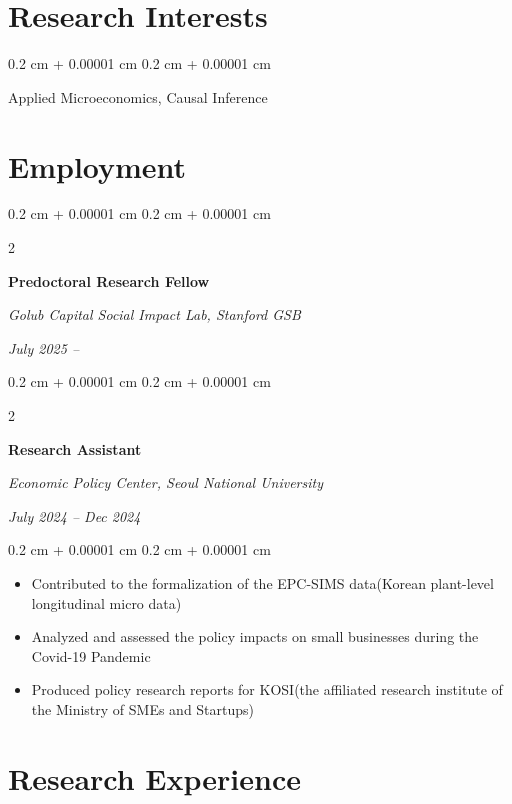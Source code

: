 \documentclass[10pt, letterpaper]{article}
\newenvironment{highlights}{
	\begin{itemize}[
		topsep=0.10 cm,
		parsep=0.10 cm,
		partopsep=0pt,
		itemsep=0pt,
		leftmargin=0.4 cm + 10pt
		]
	}{
	\end{itemize}
} %
\newenvironment{onecolentry}{
	\begin{adjustwidth}{
			0.2 cm + 0.00001 cm
		}{
			0.2 cm + 0.00001 cm
		}
	}{
	\end{adjustwidth}
} %
\newenvironment{twocolentry}[2][]{
	\onecolentry
	\def\secondColumn{#2}
	\setcolumnwidth{\fill, 4.5 cm}
	\begin{paracol}{2}
	}{
		\switchcolumn \raggedleft \secondColumn
	\end{paracol}
	\endonecolentry
} %
\begin{document}
	
	
	
		\section{Research Interests}
	
	\begin{onecolentry}
Applied Microeconomics, Causal Inference
	\end{onecolentry}
	
	\vspace{0.2 cm}
	
	
	\section{Employment}
	
			\begin{twocolentry}{
			\textit{July 2025 –}    
			
			\textit{}}
		\textbf{Predoctoral Research Fellow}
		
		\textit{Golub Capital Social Impact Lab, Stanford GSB}
	\end{twocolentry}
	
	\vspace{0.20cm}
		\begin{twocolentry}{
			\textit{July 2024 – Dec 2024}    
			
			\textit{}}
		\textbf{Research Assistant}
		
		\textit{Economic Policy Center, Seoul National University}
	\end{twocolentry}
	
	\vspace{0.10 cm}
	\begin{onecolentry}
		\begin{highlights}
			\item Contributed to the formalization of the EPC-SIMS data(Korean plant-level longitudinal micro data)
			\item Analyzed and assessed the policy impacts on small businesses during the Covid-19 Pandemic
			\item Produced policy research reports for KOSI(the affiliated research institute of the Ministry of SMEs and Startups)
		\end{highlights}
	\end{onecolentry}
	
	
	\vspace{0.2 cm}
	
	\section{Research Experience}
	
\end{document}

